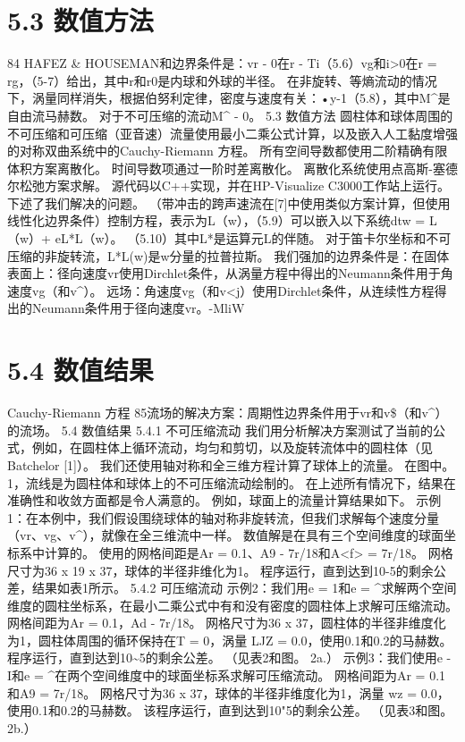 \documentclass[UTF8,11pt,a4paper,openany,fontset=fandol]{ctexbook}
\begin{document}
\section{5.3 数值方法}
84 HAFEZ \& HOUSEMAN和边界条件是：vr - 0在r - Ti（5.6）vg和i>0在r = rg，（5-7）给出，其中r和r0是内球和外球的半径。 在非旋转、等熵流动的情况下，涡量同样消失，根据伯努利定律，密度与速度有关：•y-1（5.8），其中M\textasciicircum{}是自由流马赫数。 对于不可压缩的流动M\textasciicircum{} - 0。 5.3 数值方法 圆柱体和球体周围的不可压缩和可压缩（亚音速）流量使用最小二乘公式计算，以及嵌入人工黏度增强的对称双曲系统中的Cauchy-Riemann 方程。 所有空间导数都使用二阶精确有限体积方案离散化。 时间导数项通过一阶时差离散化。 离散化系统使用点高斯-塞德尔松弛方案求解。 源代码以C++实现，并在HP-Visualize C3000工作站上运行。 下述了我们解决的问题。 （带冲击的跨声速流在[7]中使用类似方案计算，但使用线性化边界条件）控制方程，表示为L（w），（5.9）可以嵌入以下系统dtw = L（w）+ eL*L（w）。 （5.10）其中L*是运算元L的伴随。 对于笛卡尔坐标和不可压缩的非旋转流，L*L(w)是w分量的拉普拉斯。 我们强加的边界条件是：在固体表面上：径向速度vr使用Dirchlet条件，从涡量方程中得出的Neumann条件用于角速度vg（和v\textasciicircum{}）。 远场：角速度vg（和v<j）使用Dirchlet条件，从连续性方程得出的Neumann条件用于径向速度vr。-MliW

\section{5.4 数值结果}
Cauchy-Riemann 方程 85流场的解决方案：周期性边界条件用于vr和v\$（和v\textasciicircum{}）的流场。 5.4 数值结果 5.4.1 不可压缩流动 我们用分析解决方案测试了当前的公式，例如，在圆柱体上循环流动，均匀和剪切，以及旋转流体中的圆柱体（见Batchelor [1]）。 我们还使用轴对称和全三维方程计算了球体上的流量。 在图中。 1，流线是为圆柱体和球体上的不可压缩流动绘制的。 在上述所有情况下，结果在准确性和收敛方面都是令人满意的。 例如，球面上的流量计算结果如下。 示例1：在本例中，我们假设围绕球体的轴对称非旋转流，但我们求解每个速度分量（vr、vg、v\textasciicircum{}），就像在全三维流中一样。 数值解是在具有三个空间维度的球面坐标系中计算的。 使用的网格间距是Ar = 0.1、A9 - 7r/18和A<f> = 7r/18。 网格尺寸为36 x 19 x 37，球体的半径非维化为1。 程序运行，直到达到10-5的剩余公差，结果如表1所示。 5.4.2 可压缩流动 示例2：我们用e = 1和e = \textasciicircum{}求解两个空间维度的圆柱坐标系，在最小二乘公式中有和没有密度的圆柱体上求解可压缩流动。 网格间距为Ar = 0.1，Ad - 7r/18。 网格尺寸为36 x 37，圆柱体的半径非维度化为1，圆柱体周围的循环保持在T = 0，涡量 LJZ = 0.0，使用0.1和0.2的马赫数。 程序运行，直到达到10\textasciitilde{}5的剩余公差。 （见表2和图。 2a.） 示例3：我们使用e - I和e = \textasciicircum{}在两个空间维度中的球面坐标系求解可压缩流动。 网格间距为Ar = 0.1和A9 = 7r/18。 网格尺寸为36 x 37，球体的半径非维度化为1，涡量 wz = 0.0，使用0.1和0.2的马赫数。 该程序运行，直到达到10"5的剩余公差。 （见表3和图。 2b.）
\end{document}
